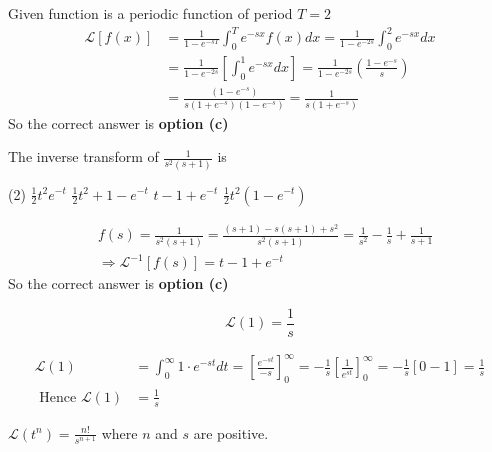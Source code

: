 \begin{answer}
	Given function is a periodic function of period $T=2$
	\begin{align*}
	\mathcal{L}[f(x)] &=\frac{1}{1-e^{-s T}} \int_{0}^{T} e^{-s x} f(x) d x=\frac{1}{1-e^{-2 s}} \int_{0}^{2} e^{-s x} d x \\
	&=\frac{1}{1-e^{-2 s}}\left[\int_{0}^{1} e^{-s x} d x\right]=\frac{1}{1-e^{-2 s}}\left(\frac{1-e^{-s}}{s}\right) \\
	&=\frac{\left(1-e^{-s}\right)}{s\left(1+e^{-s}\right)\left(1-e^{-s}\right)}=\frac{1}{s\left(1+e^{-s}\right)}
	\end{align*}
	So the correct answer is \textbf{option (c)}
\end{answer}
\begin{exercise}
	The inverse transform of $\frac{1}{s^2(s+1)}$ is
	\begin{tasks}(2)
		\task[\textbf{a.}]$\frac{1}{2} t^{2} e^{-t}$
		\task[\textbf{b.}]$\frac{1}{2} t^{2}+1-e^{-t}$
		\task[\textbf{c.}]$t-1+e^{-t}$
		\task[\textbf{d.}] $\frac{1}{2} t^{2}\left(1-e^{-t}\right)$ 
	\end{tasks}
\end{exercise}
\begin{answer}
	\begin{align*}
	&f(s)=\frac{1}{s^{2}(s+1)}=\frac{(s+1)-s(s+1)+s^{2}}{s^{2}(s+1)}=\frac{1}{s^{2}}-\frac{1}{s}+\frac{1}{s+1} \\
	&\Rightarrow \mathcal{L}^{-1}[f(s)]=t-1+e^{-t}
	\end{align*}
	So the correct answer is \textbf{option (c)}
\end{answer}
\begin{exercise}
	$$
	\mathcal{L}(1)=\frac{1}{s}
	$$
\end{exercise}
\begin{answer}
	\begin{align*}
		\mathcal{L}(1)&=\int_{0}^{\infty} 1 \cdot e^{-s t} d t=\left[\frac{e^{-s t}}{-s}\right]_{0}^{\infty}=-\frac{1}{s}\left[\frac{1}{e^{s t}}\right]_{0}^{\infty}=-\frac{1}{s}[0-1]=\frac{1}{s}\\
		\text{ Hence }\mathcal{L}(1)&=\frac{1}{s}
	\end{align*}
\end{answer}
\begin{exercise}
	$\mathcal{L}\left(t^{n}\right)=\frac{n !}{s^{n+1}}$ where $n$ and $s$ are positive.
\end{exercise}
